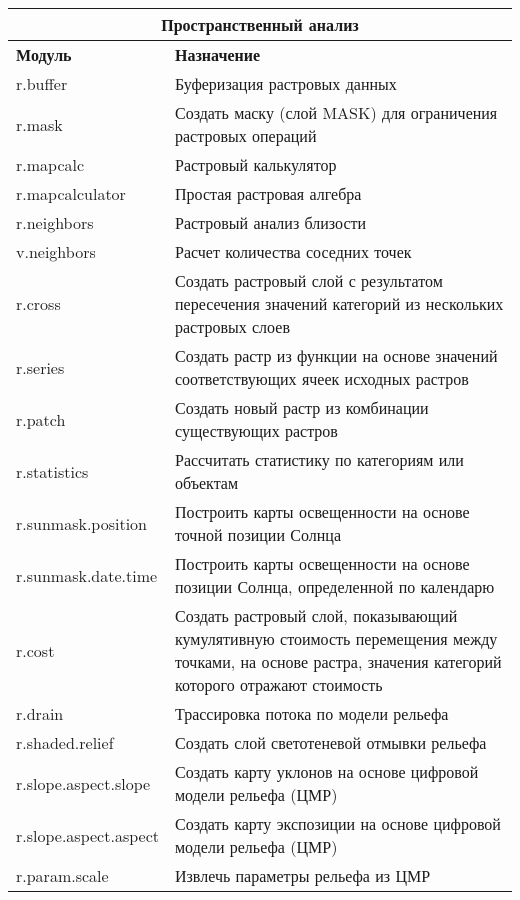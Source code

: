 {\renewcommand{\arraystretch}{0.7}
\begin{table}[H]
\centering
 \begin{tabular}{|p{4cm}|p{10cm}|}
  \hline \multicolumn{2}{|c|}{\textbf{Пространственный анализ}} \\
  \hline \textbf{Модуль} & \textbf{Назначение} \\
  \hline r.buffer & Буферизация растровых данных \\
  \hline r.mask & Создать маску (слой MASK) для ограничения растровых
  операций \\
  \hline r.mapcalc & Растровый калькулятор \\
  \hline r.mapcalculator & Простая растровая алгебра \\
  \hline r.neighbors & Растровый анализ близости \\
  \hline v.neighbors & Расчет количества соседних точек \\
  \hline r.cross & Создать растровый слой с результатом пересечения
  значений категорий из нескольких растровых слоев \\
  \hline r.series & Создать растр из функции на основе значений
  соответствующих ячеек исходных растров \\
  \hline r.patch & Создать новый растр из комбинации существующих растров \\
  \hline r.statistics & Рассчитать статистику по категориям или объектам \\
  \hline r.sunmask.position & Построить карты освещенности на основе
  точной позиции Солнца \\
  \hline r.sunmask.date.time & Построить карты освещенности на основе
  позиции Солнца, определенной по календарю \\
  \hline r.cost & Создать растровый слой, показывающий кумулятивную
  стоимость перемещения между точками, на основе растра, значения
  категорий которого отражают стоимость \\
  \hline r.drain & Трассировка потока по модели рельефа \\
  \hline r.shaded.relief & Создать слой светотеневой отмывки рельефа \\
  \hline r.slope.aspect.slope & Создать карту уклонов на основе
  цифровой модели рельефа (ЦМР) \\
  \hline r.slope.aspect.aspect & Создать карту экспозиции на основе
  цифровой модели рельефа (ЦМР) \\
  \hline r.param.scale & Извлечь параметры рельефа из ЦМР \\

\end{tabular}
\end{table}}
